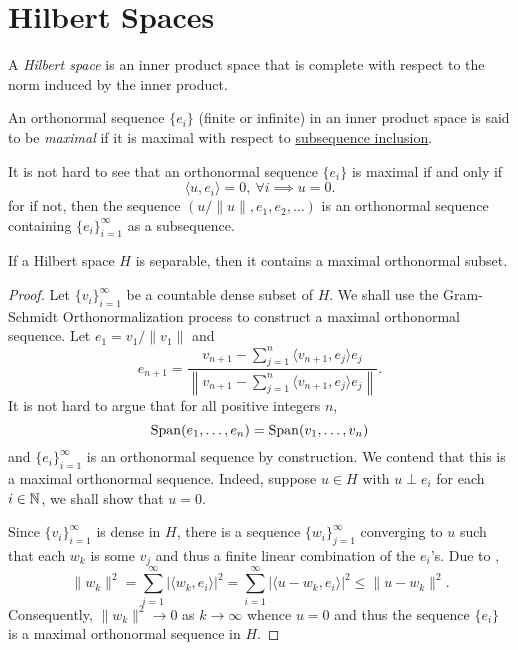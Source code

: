 \section{Hilbert Spaces}

\begin{definition}
    A \emph{Hilbert space} is an inner product space that is complete with respect to the norm induced by the inner product.
\end{definition}

\begin{definition}
    An orthonormal sequence $\{e_i\}$ (finite or infinite) in an inner product space is said to be \emph{maximal} if it is maximal with respect to \underline{subsequence inclusion}.
\end{definition}

It is not hard to see that an orthonormal sequence $\{e_i\}$ is maximal if and only if 
\begin{equation*}
    \langle u, e_i\rangle = 0,~\forall i\implies u = 0.
\end{equation*}
for if not, then the sequence $(u/\|u\|, e_1,e_2,\dots)$ is an orthonormal sequence containing $\{e_i\}_{i = 1}^\infty$ as a subsequence.

\begin{lemma}
    If a Hilbert space $H$ is separable, then it contains a maximal orthonormal subset.
\end{lemma}
\begin{proof}
    Let $\{v_i\}_{i = 1}^\infty$ be a countable dense subset of $H$. We shall use the Gram-Schmidt Orthonormalization process to construct a maximal orthonormal sequence. Let $e_1 = v_1/\|v_1\|$ and 
    \begin{equation*}
        e_{n + 1} = \frac{v_{n + 1} - \sum_{j = 1}^n\langle v_{n + 1}, e_j\rangle e_j}{\left\|v_{n + 1} - \sum_{j = 1}^n\langle v_{n + 1}, e_j\rangle e_j\right\|}.
    \end{equation*}
    It is not hard to argue that for all positive integers $n$, 
    \begin{equation*}
        \operatorname{Span}(e_1,\dots,e_n) = \operatorname{Span}(v_1,\dots,v_n)
    \end{equation*}
    and $\{e_i\}_{i = 1}^\infty$ is an orthonormal sequence by construction. We contend that this is a maximal orthonormal sequence. Indeed, suppose $u\in H$ with $u\perp e_i$ for each $i\in\mathbb{N}$, we shall show that $u = 0$.

    Since $\{v_i\}_{i = 1}^\infty$ is dense in $H$, there is a sequence $\{w_i\}_{j = 1}^\infty$ converging to $u$ such that each $w_k$ is some $v_j$ and thus a finite linear combination of the $e_i$'s. Due to , 
    \begin{equation*}
        \|w_k\|^2 = \sum_{i = 1}^\infty|\langle w_k, e_i\rangle|^2 = \sum_{i = 1}^\infty |\langle u - w_k, e_i\rangle|^2\le\|u - w_k\|^2.
    \end{equation*}
    Consequently, $\|w_k\|^2\to 0$ as $k\to\infty$ whence $u = 0$ and thus the sequence $\{e_i\}$ is a maximal orthonormal sequence in $H$.
\end{proof}

